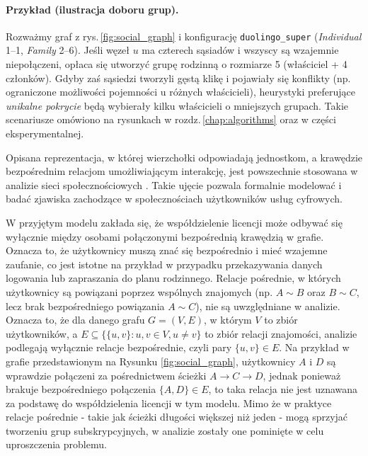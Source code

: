\paragraph{Przykład (ilustracja doboru grup).} Rozważmy graf z rys.\,\ref{fig:social_graph} i konfigurację \texttt{duolingo\_super} (\emph{Individual} 1–1, \emph{Family} 2–6). Jeśli węzeł $u$ ma czterech sąsiadów i wszyscy są wzajemnie niepołączeni, opłaca się utworzyć grupę rodzinną o rozmiarze 5 (właściciel + 4 członków). Gdyby zaś sąsiedzi tworzyli gęstą klikę i pojawiały się konflikty (np. ograniczone możliwości pojemności u różnych właścicieli), heurystyki preferujące \emph{unikalne pokrycie} będą wybierały kilku właścicieli o mniejszych grupach. Takie scenariusze omówiono na rysunkach w rozdz.\,\ref{chap:algorithms} oraz w części eksperymentalnej.

Opisana reprezentacja, w której wierzchołki odpowiadają jednostkom, a krawędzie bezpośrednim relacjom umożliwiającym interakcję, jest powszechnie stosowana w analizie sieci społecznościowych \cite{Brandes2004, NETTLETON20131}. Takie ujęcie pozwala formalnie modelować i badać zjawiska zachodzące w społecznościach użytkowników usług cyfrowych.

W przyjętym modelu zakłada się, że współdzielenie licencji może odbywać się wyłącznie między osobami połączonymi bezpośrednią krawędzią w grafie. Oznacza to, że użytkownicy muszą znać się bezpośrednio i mieć wzajemne zaufanie, co jest istotne na przykład w przypadku przekazywania danych logowania lub zapraszania do planu rodzinnego. Relacje pośrednie, w których użytkownicy są powiązani poprzez wspólnych znajomych (np. \( A \sim B \) oraz \( B \sim C \), lecz brak bezpośredniego powiązania \( A \sim C \)), nie są uwzględniane w analizie. Oznacza to, że dla danego grafu \( G = (V, E) \),
w którym \( V \) to zbiór użytkowników, a \( E \subseteq \{ \{u,v\} : u,v \in V, u \neq v \} \) to zbiór relacji znajomości, analizie podlegają wyłącznie relacje bezpośrednie, czyli pary \( \{u, v\} \in E \).
Na przykład w grafie przedstawionym na Rysunku \ref{fig:social_graph}, użytkownicy \( A \) i \( D \) są wprawdzie połączeni za pośrednictwem ścieżki \( A \rightarrow C \rightarrow D \), jednak ponieważ brakuje bezpośredniego połączenia \( \{A,D\} \in E \), to taka relacja nie jest uznawana za podstawę do współdzielenia licencji w tym modelu.
Mimo że w praktyce relacje pośrednie - takie jak ścieżki długości większej niż jeden - mogą sprzyjać tworzeniu grup subskrypcyjnych, w analizie zostały one pominięte w celu uproszczenia problemu.

